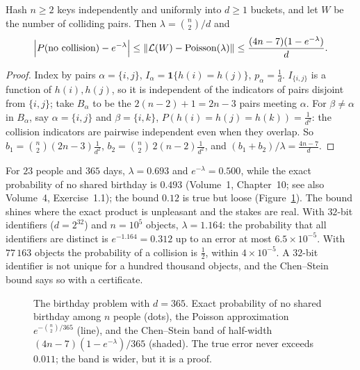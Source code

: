 \begin{example}\label{ex:hashcs}
Hash $n\ge2$ keys independently and uniformly into $d\ge1$ buckets, and let $W$ be the number of colliding pairs. Then $\lambda=\binom n2/d$ and
\[
\Bigl|P(\text{no collision})-e^{-\lambda}\Bigr|\le\|\mathcal L(W)-\text{Poisson}(\lambda)\|\le\frac{(4n-7)(1-e^{-\lambda})}d.
\]
\end{example}
\begin{proof}
Index by pairs $\alpha=\{i,j\}$, $I_\alpha=\mathbf 1\{h(i)=h(j)\}$, $p_\alpha=\frac1d$. $I_{\{i,j\}}$ is a function of $h(i),h(j)$, so it is independent of the
indicators of pairs disjoint from $\{i,j\}$; take $B_\alpha$ to be the $2(n-2)+1=2n-3$ pairs meeting $\alpha$. For $\beta\ne\alpha$ in $B_\alpha$, say $\alpha=\{i,j\}$
and $\beta=\{i,k\}$, $P(h(i)=h(j)=h(k))=\frac1{d^2}$: the collision indicators are pairwise independent even when they overlap. So
$b_1=\binom n2(2n-3)\frac1{d^2}$, $b_2=\binom n2\,2(n-2)\frac1{d^2}$, and $(b_1+b_2)/\lambda=\frac{4n-7}d$.
\end{proof}

For $23$ people and $365$ days, $\lambda=0.693$ and $e^{-\lambda}=0.500$, while the exact probability of no shared birthday is $0.493$ (Volume~1, Chapter~10; see also Volume~4, Exercise~1.1);
the bound $0.12$ is true but loose (Figure~\ref{fig:birthday}). The bound shines where the exact product is unpleasant and the stakes are real. With $32$-bit identifiers
($d=2^{32}$) and $n=10^5$ objects, $\lambda=1.164$: the probability that all identifiers are distinct is $e^{-1.164}=0.312$ up to an error at most
$6.5\times10^{-5}$. With $77\,163$ objects the probability of a collision is $\frac12$, within $4\times10^{-5}$. A $32$-bit identifier is not unique for a hundred
thousand objects, and the Chen--Stein bound says so with a certificate.

\begin{figure}[ht]
\centering{}
\caption{The birthday problem with $d=365$. Exact probability of no shared birthday among $n$ people (dots), the Poisson approximation $e^{-\binom n2/365}$ (line),
and the Chen--Stein band of half-width $(4n-7)(1-e^{-\lambda})/365$ (shaded). The true error never exceeds $0.011$; the band is wider, but it is a proof.}
\label{fig:birthday}
\end{figure}

